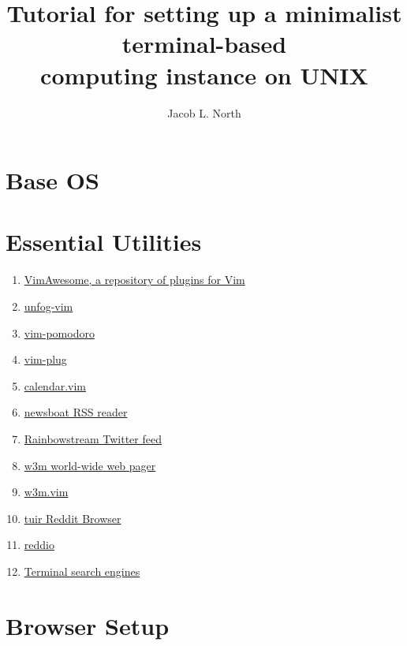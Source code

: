 \documentclass[]{article}
\title{Tutorial for setting up a minimalist terminal-based\\computing instance on UNIX}
\author{Jacob L. North}
\begin{document}
\maketitle

\vfill

\tableofcontents

\vfill

\section{Base OS}

\section{Essential Utilities}
\begin{enumerate}
    \item \href{https://vimawesome.com/}{VimAwesome, a repository of plugins for Vim}
    \item \href{https://github.com/unfog-io/unfog-vim}{unfog-vim}
    \item \href{https://github.com/mnick/vim-pomodoro}{vim-pomodoro}
    \item \href{https://github.com/junegunn/vim-plug}{vim-plug}
    \item \href{https://github.com/itchyny/calendar.vim}{calendar.vim}
    \item \href{https://github.com/newsboat/newsboat}{newsboat RSS reader}
    \item \href{https://github.com/orakaro/rainbowstream}{Rainbowstream Twitter feed}
    \item \href{https://github.com/tats/w3m}{w3m world-wide web pager}
    \item \href{https://github.com/yuratomo/w3m.vim}{w3m.vim}
    \item \href{https://gitlab.com/ajak/tuir}{tuir Reddit Browser}
    \item \href{https://gitlab.com/aaronNG/reddio}{reddio}
    \item \href{https://vitux.com/four-web-browsers-for-the-linux-command-line/}{Terminal search engines}
\end{enumerate}

\section{Browser Setup}

\section{}
\end{document}
